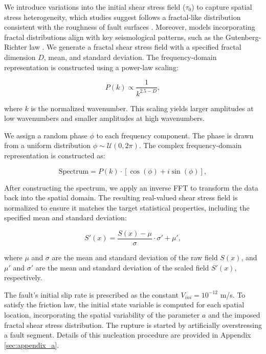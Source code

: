 \documentclass[draft]{agujournal2019}
\begin{document}
We introduce variations into the initial shear stress field (\(\tau_{0}\)) to capture spatial stress heterogeneity, which studies suggest follows a fractal-like distribution consistent with the roughness of fault surfaces \cite{andrews1980stochastic,renard2017scaling}. Moreover, models incorporating fractal distributions align with key seismological patterns, such as the Gutenberg-Richter law \cite{hirata1989correlation}. We generate a fractal shear stress field with a specified fractal dimension \(D\), mean, and standard deviation. The frequency-domain representation is constructed using a power-law scaling:

\begin{equation}
P(k) \propto \frac{1}{k^{2.5-D}},
\label{eq:amp}
\end{equation}

where \(k\) is the normalized wavenumber. This scaling yields larger amplitudes at low wavenumbers and smaller amplitudes at high wavenumbers.

We assign a random phase \( \phi \) to each frequency component. The phase is drawn from a uniform distribution \( \phi \sim \mathcal{U}(0, 2\pi) \). The complex frequency-domain representation is constructed as:

\begin{equation}
\label{eqn:domian_freq}
\text{Spectrum} = P(k) \cdot \left[ \cos(\phi) + i \sin(\phi) \right],
\end{equation}

After constructing the spectrum, we apply an inverse FFT to transform the data back into the spatial domain. The resulting real-valued shear stress field is normalized to ensure it matches the target statistical properties, including the specified mean and standard deviation:

\begin{equation}
\label{eqn:normalized_fractal}
S'(x) = \frac{S(x) - \mu}{\sigma} \cdot \sigma' + \mu',
\end{equation}

where $\mu$ and $\sigma$ are the mean and standard deviation of the raw field $S(x)$, and $\mu'$ and $\sigma'$ are the mean and standard deviation of the scaled field $S'(x)$, respectively.

The fault's initial slip rate is prescribed as the constant $V_{ini}=10^{-12}$ m/s. To satisfy the friction law, the initial state variable is computed for each spatial location, incorporating the spatial variability of the parameter $a$ and the imposed fractal shear stress distribution. The rupture is started by artificially overstressing a fault segment. Details of this nucleation procedure are provided in Appendix \ref{sec:appendix_a}.
\end{document}

